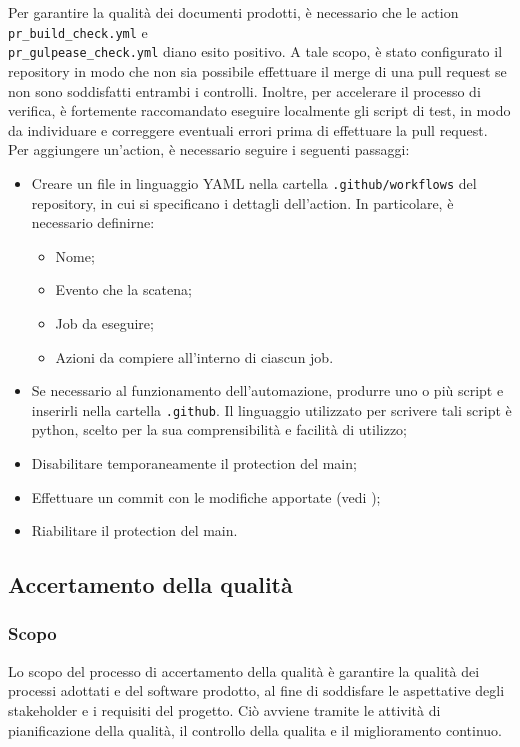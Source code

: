 Per garantire la qualità dei documenti prodotti, è necessario che le action \texttt{pr\_build\_check.yml}
e \\\texttt{pr\_gulpease\_check.yml} diano esito positivo. A tale scopo, è stato configurato il repository in modo
che non sia possibile effettuare il merge di una pull request se non sono soddisfatti entrambi i controlli.
Inoltre, per accelerare il processo di verifica, è fortemente raccomandato eseguire localmente gli script di test,
in modo da individuare e correggere eventuali errori prima di effettuare la pull request.
Per aggiungere un'action, è necessario seguire i seguenti passaggi:
\begin{itemize}
      \item Creare un file in linguaggio YAML nella cartella \texttt{.github/workflows} del
            repository, in cui si specificano i dettagli dell'action. In particolare, è
            necessario definirne:
            \begin{itemize}
                  \item Nome;
                  \item Evento che la scatena;
                  \item Job da eseguire;
                  \item Azioni da compiere all'interno di ciascun job.
            \end{itemize}
      \item Se necessario al funzionamento dell'automazione, produrre uno o più script e
            inserirli nella cartella \texttt{.github}. Il linguaggio utilizzato per
            scrivere tali script è python, scelto per la sua comprensibilità e facilità di
            utilizzo;
      \item Disabilitare temporaneamente il protection del main;
      \item Effettuare un commit con le modifiche apportate (vedi );
      \item Riabilitare il protection del main.
\end{itemize}

\subsection{Accertamento della qualità}
\subsubsection{Scopo}
Lo scopo del processo di accertamento della qualità è garantire la qualità dei
processi adottati e del software prodotto, al fine di soddisfare le aspettative
degli stakeholder e i requisiti del progetto. Ciò avviene tramite le attività
di pianificazione della qualità, il controllo della qualita e il miglioramento
continuo.
